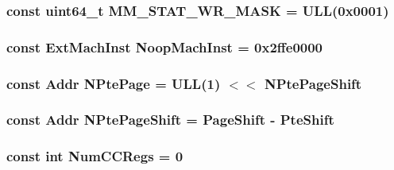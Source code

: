 \label{namespaceAlphaISA_a0bd71744e6a29780f244bc897291ca57}
\hypertarget{namespaceAlphaISA_a305c800386d962542fb4c74e5961121f}{
\subsubsection[{MM\_\-STAT\_\-WR\_\-MASK}]{\setlength{\rightskip}{0pt plus 5cm}const uint64\_\-t {\bf MM\_\-STAT\_\-WR\_\-MASK} = ULL(0x0001)}}
\label{namespaceAlphaISA_a305c800386d962542fb4c74e5961121f}
\hypertarget{namespaceAlphaISA_a8d1e39e0ea757dcc9725c6ccd81dd4c4}{
\subsubsection[{NoopMachInst}]{\setlength{\rightskip}{0pt plus 5cm}const {\bf ExtMachInst} {\bf NoopMachInst} = 0x2ffe0000}}
\label{namespaceAlphaISA_a8d1e39e0ea757dcc9725c6ccd81dd4c4}
\hypertarget{namespaceAlphaISA_ae295358052b4e754e08cd5cd763c212a}{
\subsubsection[{NPtePage}]{\setlength{\rightskip}{0pt plus 5cm}const {\bf Addr} {\bf NPtePage} = ULL(1) $<$$<$ {\bf NPtePageShift}}}
\label{namespaceAlphaISA_ae295358052b4e754e08cd5cd763c212a}
\hypertarget{namespaceAlphaISA_a9f060ccda225dfb28dff712695adab46}{
\subsubsection[{NPtePageShift}]{\setlength{\rightskip}{0pt plus 5cm}const {\bf Addr} {\bf NPtePageShift} = {\bf PageShift} -\/ {\bf PteShift}}}
\label{namespaceAlphaISA_a9f060ccda225dfb28dff712695adab46}
\hypertarget{namespaceAlphaISA_a717317b863009b3e1b683c3bdddb9fd3}{
\subsubsection[{NumCCRegs}]{\setlength{\rightskip}{0pt plus 5cm}const int {\bf NumCCRegs} = 0}}
